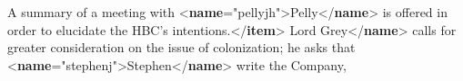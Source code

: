 \begin{shaded}
\hspace*{1em}\hspace*{1em}A\mbox{}\newline 
\hspace*{1em}\hspace*{1em}\hspace*{1em}\hspace*{1em}\hspace*{1em}\hspace*{1em} summary of a meeting with {<\textbf{name}\hspace*{1em}{key}="{pelly\textunderscore jh}">}Pelly{</\textbf{name}>} is offered in\mbox{}\newline 
\hspace*{1em}\hspace*{1em}\hspace*{1em}\hspace*{1em}\hspace*{1em}\hspace*{1em} order to elucidate the HBC's intentions.{</\textbf{item}>}\mbox{}\newline 
\hspace*{1em}\hspace*{1em}\mbox{}\newline 
\hspace*{1em}\hspace*{1em}\hspace*{1em}Lord Grey{</\textbf{name}>} calls\mbox{}\newline 
\hspace*{1em}\hspace*{1em}\hspace*{1em}\hspace*{1em}\hspace*{1em}\hspace*{1em} for greater consideration on the issue of\mbox{}\newline 
\hspace*{1em}\hspace*{1em}\hspace*{1em}\hspace*{1em}\hspace*{1em}\hspace*{1em} colonization; he asks that {<\textbf{name}\hspace*{1em}{key}="{stephen\textunderscore j}">}Stephen{</\textbf{name}>} write the Company,\mbox{}\newline 

\end{shaded}
